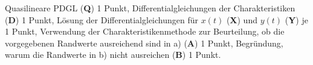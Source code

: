 \begin{bewertung}
Quasilineare PDGL ({\bf Q}) 1 Punkt,
Differentialgleichungen der Charakteristiken ({\bf D}) 1 Punkt,
Lösung der Differentialgleichungen für $x(t)$ ({\bf X})
und $y(t)$ ({\bf Y}) je 1 Punkt,
Verwendung der Charakteristikenmethode zur Beurteilung, ob die
vorgegebenen Randwerte ausreichend sind in a) ({\bf A}) 1 Punkt,
Begründung, warum die Randwerte in b) nicht ausreichen ({\bf B}) 1 Punkt.
\end{bewertung}
